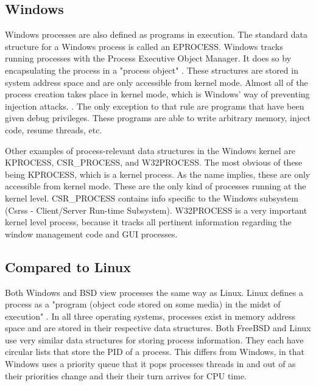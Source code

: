 \documentclass[10pt,draftclsnofoot,onecolumn]{IEEEtran}
\begin{document}
\subsection{Windows}
\label{sub:Process Windows}

\par Windows processes are also defined as programs in execution.
The standard data structure for a Windows process is called an EPROCESS.
Windows tracks running processes with the Process Executive Object Manager.
It does so by encapsulating the process in a "process object" \cite{win:1}.
These structures are stored in system address space and are only accessible from kernel mode.
Almost all of the process creation takes place in kernel mode, which is Windows' way of preventing injection attacks. \cite{win:1}.
The only exception to that rule are programs that have been given debug privileges.
These programs are able to write arbitrary memory, inject code, resume threads, etc. \cite{win:1}

\par Other examples of process-relevant data structures in the Windows kernel are KPROCESS, CSR\_PROCESS, and W32PROCESS.
The most obvious of these being KPROCESS, which is a kernel process.
As the name implies, these are only accessible from kernel mode.
These are the only kind of processes running at the kernel level.
CSR\_PROCESS contains info specific to the Windows subsystem (Csrss - Client/Server Run-time Subsystem).
W32PROCESS is a very important kernel level process, because it tracks all pertinent information regarding the window management code and GUI processes.

\subsection{Compared to Linux}
\label{sub:Process Linux}

\par Both Windows and BSD view processes the same way as Linux.
Linux defines a process as a "program (object code stored on some media) in the midst of execution" \cite{linux:1}.
In all three operating systems, processes exist in memory address space and are stored in their respective data structures.
Both FreeBSD and Linux use very similar data structures for storing process information.
They each have circular lists that store the PID of a process.
This differs from Windows, in that Windows uses a priority queue that it pops processes threads in and out of as their priorities change and their their turn arrives for CPU time.
\end{document}
